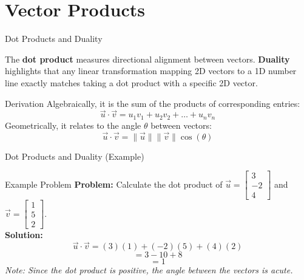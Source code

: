 \documentclass[10pt, aspectratio=169]{beamer}
\begin{document}
\section{Vector Products}

\begin{frame}{Dot Products and Duality}
    \begin{definition}
        The \textbf{dot product} measures directional alignment between vectors. \textbf{Duality} highlights that any linear transformation mapping 2D vectors to a 1D number line exactly matches taking a dot product with a specific 2D vector.
    \end{definition}

    \begin{block}{Derivation}
        Algebraically, it is the sum of the products of corresponding entries: 
        $$\vec{u} \cdot \vec{v} = u_1 v_1 + u_2 v_2 + \dots + u_n v_n$$
        Geometrically, it relates to the angle $\theta$ between vectors: 
        $$\vec{u} \cdot \vec{v} = \|\vec{u}\| \|\vec{v}\| \cos(\theta)$$
    \end{block}
\end{frame}

\begin{frame}{Dot Products and Duality (Example)}
    \begin{exampleblock}{Example Problem}
        \textbf{Problem:} Calculate the dot product of $\vec{u} = \begin{bmatrix} 3 \\ -2 \\ 4 \end{bmatrix}$ and $\vec{v} = \begin{bmatrix} 1 \\ 5 \\ 2 \end{bmatrix}$. \\
        \vspace{0.5cm}
        \textbf{Solution:}
        $$\vec{u} \cdot \vec{v} = (3)(1) + (-2)(5) + (4)(2)$$
        $$= 3 - 10 + 8$$
        $$= 1$$
        \textit{Note: Since the dot product is positive, the angle between the vectors is acute.}
    \end{exampleblock}
\end{frame}
\end{document}

